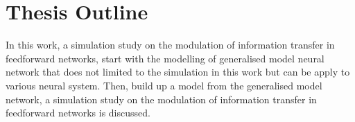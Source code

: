 \section{Thesis Outline}
In this work, a simulation study on the modulation of information transfer in feedforward networks, start with the modelling of generalised model neural network that does not limited to the simulation in this work but can be apply to various neural system. Then, build up a model from the generalised model network, a simulation study on the modulation of information transfer in feedforward networks is discussed. 






%
%
%
%
%
%
%
%
%
%
